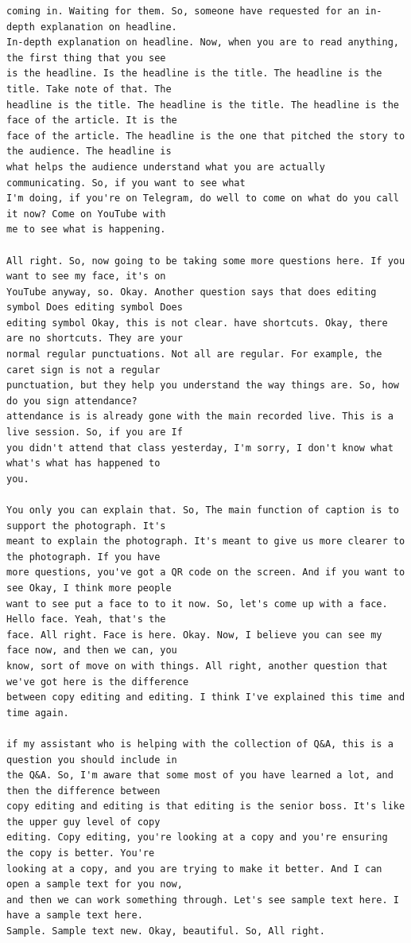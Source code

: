 {\begin{Verbatim}
coming in. Waiting for them. So, someone have requested for an in-depth explanation on headline.
In-depth explanation on headline. Now, when you are to read anything, the first thing that you see
is the headline. Is the headline is the title. The headline is the title. Take note of that. The
headline is the title. The headline is the title. The headline is the face of the article. It is the
face of the article. The headline is the one that pitched the story to the audience. The headline is
what helps the audience understand what you are actually communicating. So, if you want to see what
I'm doing, if you're on Telegram, do well to come on what do you call it now? Come on YouTube with
me to see what is happening.

All right. So, now going to be taking some more questions here. If you want to see my face, it's on
YouTube anyway, so. Okay. Another question says that does editing symbol Does editing symbol Does
editing symbol Okay, this is not clear. have shortcuts. Okay, there are no shortcuts. They are your
normal regular punctuations. Not all are regular. For example, the caret sign is not a regular
punctuation, but they help you understand the way things are. So, how do you sign attendance?
attendance is is already gone with the main recorded live. This is a live session. So, if you are If
you didn't attend that class yesterday, I'm sorry, I don't know what what's what has happened to
you.

You only you can explain that. So, The main function of caption is to support the photograph. It's
meant to explain the photograph. It's meant to give us more clearer to the photograph. If you have
more questions, you've got a QR code on the screen. And if you want to see Okay, I think more people
want to see put a face to to it now. So, let's come up with a face. Hello face. Yeah, that's the
face. All right. Face is here. Okay. Now, I believe you can see my face now, and then we can, you
know, sort of move on with things. All right, another question that we've got here is the difference
between copy editing and editing. I think I've explained this time and time again.

if my assistant who is helping with the collection of Q&A, this is a question you should include in
the Q&A. So, I'm aware that some most of you have learned a lot, and then the difference between
copy editing and editing is that editing is the senior boss. It's like the upper guy level of copy
editing. Copy editing, you're looking at a copy and you're ensuring the copy is better. You're
looking at a copy, and you are trying to make it better. And I can open a sample text for you now,
and then we can work something through. Let's see sample text here. I have a sample text here.
Sample. Sample text new. Okay, beautiful. So, All right.


\end{Verbatim}}

